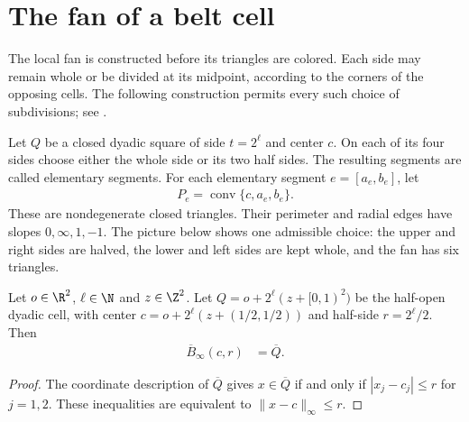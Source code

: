\section{The fan of a belt cell}
\label{sec:area_law_cell_fans}

The local fan is constructed before its triangles are colored. Each side
may remain whole or be divided at its midpoint, according to the corners
of the opposing cells. The following construction permits every such
choice of subdivisions; see \cite[Section~11]{OpenAI2026AreaLaw}.


\begin{definition}
    \label{def:area_law_cell_fan}
    \leanok
    Let $Q$ be a closed dyadic square of side $t=2^\ell$ and center $c$.
    On each of its four sides choose either the whole side or its two
    half sides. The resulting segments are called elementary segments.
    For each elementary segment $e=[a_e,b_e]$, let
    \begin{align}
        P_e=\operatorname{conv}\{c,a_e,b_e\}.
    \end{align}
    These are nondegenerate closed triangles. Their perimeter and radial
    edges have slopes $0,\infty,1,-1$.
    The picture below shows one admissible choice: the upper and right
    sides are halved, the lower and left sides are kept whole, and the fan
    has six triangles.
    
\end{definition}

\begin{lemma}
    \label{thm:area_law_cell_fan_closed_ball}
    \leanok
    Let $o\in\R^2$, $\ell\in\N$ and $z\in\Z^2$. Let
    $Q=o+2^\ell(z+[0,1)^2)$ be the half-open dyadic cell, with
    center $c=o+2^\ell(z+(1/2,1/2))$ and half-side $r=2^\ell/2$.
    Then
    \begin{align}
        \overline{B}_\infty(c,r) & =\overline Q.
    \end{align}
\end{lemma}
\begin{proof}\leanok
    The coordinate description of $\overline Q$ gives
    $x\in\overline Q$ if and only if $|x_j-c_j|\le r$ for $j=1,2$.
    These inequalities are equivalent to $\|x-c\|_\infty\le r$.
\end{proof}

